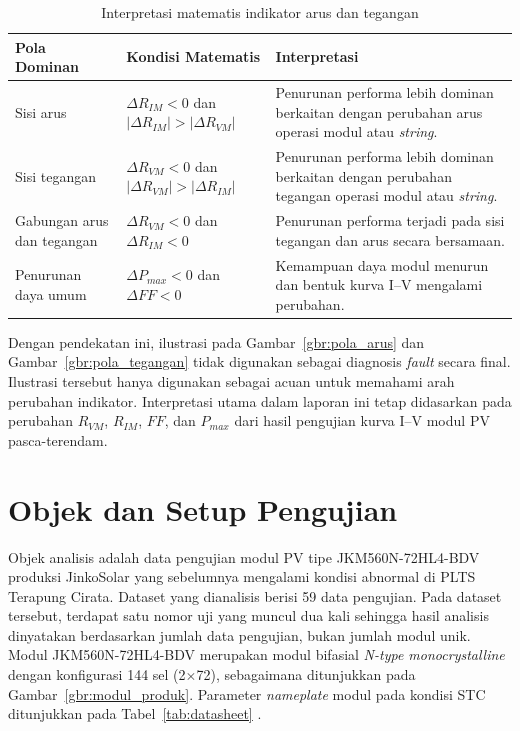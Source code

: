 \begin{table}[H]
\caption{Interpretasi matematis indikator arus dan tegangan}
\label{tab:pola_arus_tegangan}
\label{tab:fault_signature}
\centering
\begin{tabularx}{\textwidth}{
    >{\raggedright\arraybackslash}p{3.1cm}
    >{\raggedright\arraybackslash}p{4.0cm}
    >{\raggedright\arraybackslash}X
}
\toprule
\textbf{Pola Dominan} &
\textbf{Kondisi Matematis} &
\textbf{Interpretasi} \\
\midrule
Sisi arus &
$\Delta R_{IM}<0$ dan $|\Delta R_{IM}|>|\Delta R_{VM}|$ &
Penurunan performa lebih dominan berkaitan dengan perubahan arus operasi modul
atau \textit{string}. \\
\midrule
Sisi tegangan &
$\Delta R_{VM}<0$ dan $|\Delta R_{VM}|>|\Delta R_{IM}|$ &
Penurunan performa lebih dominan berkaitan dengan perubahan tegangan operasi
modul atau \textit{string}. \\
\midrule
Gabungan arus dan tegangan &
$\Delta R_{VM}<0$ dan $\Delta R_{IM}<0$ &
Penurunan performa terjadi pada sisi tegangan dan arus secara bersamaan. \\
\midrule
Penurunan daya umum &
$\Delta P_{max}<0$ dan $\Delta FF<0$ &
Kemampuan daya modul menurun dan bentuk kurva I--V mengalami perubahan. \\
\bottomrule
\end{tabularx}
\end{table}

Dengan pendekatan ini, ilustrasi pada Gambar~\ref{gbr:pola_arus} dan
Gambar~\ref{gbr:pola_tegangan} tidak digunakan sebagai diagnosis
\textit{fault} secara final. Ilustrasi tersebut hanya digunakan sebagai acuan
untuk memahami arah perubahan indikator. Interpretasi utama dalam laporan ini
tetap didasarkan pada perubahan $R_{VM}$, $R_{IM}$, $FF$, dan $P_{max}$ dari
hasil pengujian kurva I--V modul PV pasca-terendam.

\section{Objek dan Setup Pengujian}

Objek analisis adalah data pengujian modul PV tipe JKM560N-72HL4-BDV produksi
JinkoSolar yang sebelumnya mengalami kondisi abnormal di PLTS Terapung Cirata.
Dataset yang dianalisis berisi 59 data pengujian. Pada dataset tersebut,
terdapat satu nomor uji yang muncul dua kali sehingga hasil analisis dinyatakan
berdasarkan jumlah data pengujian, bukan jumlah modul unik. Modul
JKM560N-72HL4-BDV merupakan modul bifasial \textit{N-type monocrystalline}
dengan konfigurasi 144 sel (2$\times$72), sebagaimana ditunjukkan pada
Gambar~\ref{gbr:modul_produk}. Parameter \textit{nameplate} modul pada kondisi
STC ditunjukkan pada Tabel~\ref{tab:datasheet} \cite{jinko2022}.

